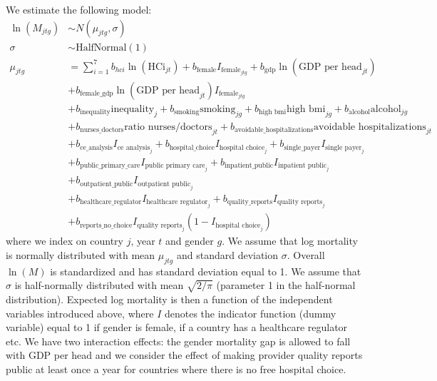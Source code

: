 \documentclass[a4paper,12pt]{article}
\begin{document}
We estimate the following model:
\begin{align*}
\ln(M_{jtg}) &\sim N(\mu_{jtg},\sigma) \\
\sigma & \sim\text{HalfNormal}(1) \\
\mu_{jtg} &= \sum_{i=1}^7 b_{hci} \ln(\text{HCi}_{jt}) + b_{\text{female}} I_{\text{female}_{jtg}} + b_{\text{gdp}} \ln(\text{GDP per head}_{jt}) \\
 & + b_{\text{female\_gdp}} \ln(\text{GDP per head}_{jt})  I_{\text{female}_{jtg}} \\
 & + b_{\text{inequality}} \text{inequality}_{j} + b_{\text{smoking}} \text{smoking}_{jg}+ b_{\text{high bmi}} \text{high bmi}_{jg}+ b_{\text{alcohol}} \text{alcohol}_{jg} \\
 & + b_{\text{nurses\_doctors}} \text{ratio nurses/doctors}_{jt} + b_{\text{avoidable\_hospitalizations}} \text{avoidable hospitalizations}_{jt} \\
 & + b_{\text{ce\_analysis}} I_{\text{ce analysis}_{j}} +  b_{\text{hospital\_choice}} I_{\text{hospital choice}_{j}} + b_{\text{single\_payer}} I_{\text{single payer}_{j}} \\
 & +  b_{\text{public\_primary\_care}} I_{\text{public primary care}_j} + b_{\text{inpatient\_public}} I_{\text{inpatient public}_{j}} \\
 & + b_{\text{outpatient\_public}} I_{\text{outpatient public}_j} \\
 & + b_{\text{healthcare\_regulator}} I_{\text{healthcare regulator}_j} + b_{\text{quality\_reports}} I_{\text{quality reports}_j} \\
 & + b_{\text{reports\_no\_choice}} I_{\text{quality reports}_j} (1-I_{\text{hospital choice}_j})
\end{align*}
where we index on country \(j\), year \(t\) and gender \(g\). We assume that log mortality is normally distributed with mean \(\mu_{jtg}\) and standard deviation \(\sigma\). Overall \(\ln(M)\) is standardized and has standard deviation equal to 1. We assume that \(\sigma\) is half-normally distributed with mean \(\sqrt{2/\pi}\) (parameter 1 in the half-normal distribution). Expected log mortality is then a function of the independent variables introduced above, where \(I\) denotes the indicator function (dummy variable) equal to 1 if gender is female, if a country has a healthcare regulator etc. We have two interaction effects: the gender mortality gap is allowed to fall with GDP per head and we consider the effect of making provider quality reports public at least once a year for countries where there is no free hospital choice.
\end{document}
